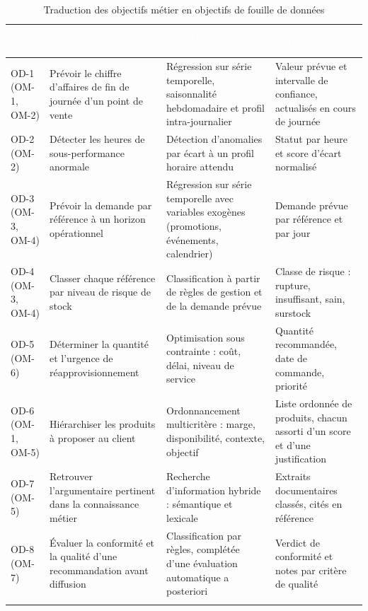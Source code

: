 \begin{longtable}{|P{1.2cm}|P{4.0cm}|P{3.0cm}|P{5.6cm}|}
\hline
{}
\textcolor{white}{\textbf{Réf.}} &
\textcolor{white}{\textbf{Objectif de fouille de données}} &
\textcolor{white}{\textbf{Nature du problème}} &
\textcolor{white}{\textbf{Sortie attendue}} \\
\hline
\endhead
\hline
\endfoot
\hline
\endlastfoot
OD-1 \newline \small (OM-1, OM-2) & Prévoir le chiffre d'affaires de fin de journée d'un point de vente & Régression sur série temporelle, saisonnalité hebdomadaire et profil intra-journalier & Valeur prévue et intervalle de confiance, actualisés en cours de journée \\
\hline
OD-2 \newline \small (OM-2) & Détecter les heures de sous-performance anormale & Détection d'anomalies par écart à un profil horaire attendu & Statut par heure et score d'écart normalisé \\
\hline
OD-3 \newline \small (OM-3, OM-4) & Prévoir la demande par référence à un horizon opérationnel & Régression sur série temporelle avec variables exogènes (promotions, événements, calendrier) & Demande prévue par référence et par jour \\
\hline
OD-4 \newline \small (OM-3, OM-4) & Classer chaque référence par niveau de risque de stock & Classification à partir de règles de gestion et de la demande prévue & Classe de risque : rupture, insuffisant, sain, surstock \\
\hline
OD-5 \newline \small (OM-6) & Déterminer la quantité et l'urgence de réapprovisionnement & Optimisation sous contrainte : coût, délai, niveau de service & Quantité recommandée, date de commande, priorité \\
\hline
OD-6 \newline \small (OM-1, OM-5) & Hiérarchiser les produits à proposer au client & Ordonnancement multicritère : marge, disponibilité, contexte, objectif & Liste ordonnée de produits, chacun assorti d'un score et d'une justification \\
\hline
OD-7 \newline \small (OM-5) & Retrouver l'argumentaire pertinent dans la connaissance métier & Recherche d'information hybride : sémantique et lexicale & Extraits documentaires classés, cités en référence \\
\hline
OD-8 \newline \small (OM-7) & Évaluer la conformité et la qualité d'une recommandation avant diffusion & Classification par règles, complétée d'une évaluation automatique a posteriori & Verdict de conformité et notes par critère de qualité \\
\hline
\caption{Traduction des objectifs métier en objectifs de fouille de données}
\label{tab:objectifs-fouille-chap2}
\end{longtable}
\endgroup


